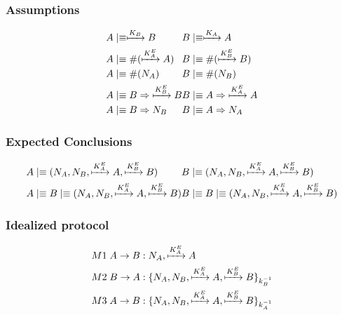 \subsubsection{Assumptions}
\begin{align*}
    \begin{split}
        &A \mid\equiv \xmapsto{K_B} B \\
        &A \mid\equiv \#(\xmapsto{K_A^E}A) \\
        &A \mid\equiv \#(N_A) \\
        &A \mid\equiv B \Rightarrow{\xmapsto{K_B^E}B} \\
        &A \mid\equiv B \Rightarrow{N_B}
    \end{split}
    \begin{split}
        &B \mid\equiv \xmapsto{K_A} A \\
        &B \mid\equiv \#(\xmapsto{K_B^E}B) \\
        &B \mid\equiv \#(N_B) \\
        &B \mid\equiv A \Rightarrow{\xmapsto{K_A^E}A} \\
        &B \mid\equiv A \Rightarrow{N_A}
    \end{split}
\end{align*}
\subsubsection{Expected Conclusions}
\begin{align*}
    \begin{split}
        &A \mid\equiv (N_A,N_B,\xmapsto{K_A^E}A,\xmapsto{K_B^E}B) \\
        &A \mid\equiv B \mid\equiv (N_A,N_B,\xmapsto{K_A^E}A,\xmapsto{K_B^E}B)
    \end{split}
    \begin{split}
        &B \mid\equiv (N_A,N_B,\xmapsto{K_A^E}A,\xmapsto{K_B^E}B) \\
        &B \mid\equiv B \mid\equiv (N_A,N_B,\xmapsto{K_A^E}A,\xmapsto{K_B^E}B)
    \end{split}
\end{align*}

\subsubsection{Idealized protocol}
\begin{align*}
    &M1 \; A \rightarrow B : N_A, \xmapsto{K_A^E}A \\
    &M2 \; B \rightarrow A : \{N_A,N_B,\xmapsto{K_A^E}A,\xmapsto{K_B^E}B\}_{k_B^{-1}} \\
    &M3 \; A \rightarrow B : \{N_A,N_B,\xmapsto{K_A^E}A,\xmapsto{K_B^E}B\}_{k_A^{-1}}
\end{align*}

